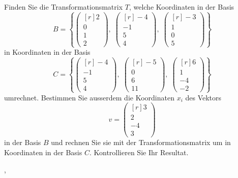 Finden Sie die Transformationsmatrix $T$, welche Koordinaten in der Basis
\[
B=\left\{
\begin{pmatrix*}[r]
2\\0\\1\\2
\end{pmatrix*},\;
\begin{pmatrix*}[r]
-4\\-1\\5\\4
\end{pmatrix*},\;
\begin{pmatrix*}[r]
-3\\1\\0\\5
\end{pmatrix*}
\right\}
\]
in Koordinaten in der Basis
\[
C=\left\{
\begin{pmatrix*}[r]
-4\\-1\\5\\4
\end{pmatrix*},\;
\begin{pmatrix*}[r]
-5\\0\\6\\11
\end{pmatrix*},\;
\begin{pmatrix*}[r]
6\\1\\-4\\-2
\end{pmatrix*}
\right\}
\]
umrechnet.
Bestimmen Sie ausserdem die Koordinaten $x_i$ des Vektors 
\[
v
=
\begin{pmatrix*}[r]
3\\2\\-4\\3
\end{pmatrix*}
\]
in der Basis $B$ und rechnen Sie sie mit der Transformationsmatrix um in
Koordinaten in der Basis $C$. Kontrollieren Sie Ihr Resultat.

\begin{hinweis}
,
\end{hinweis}


